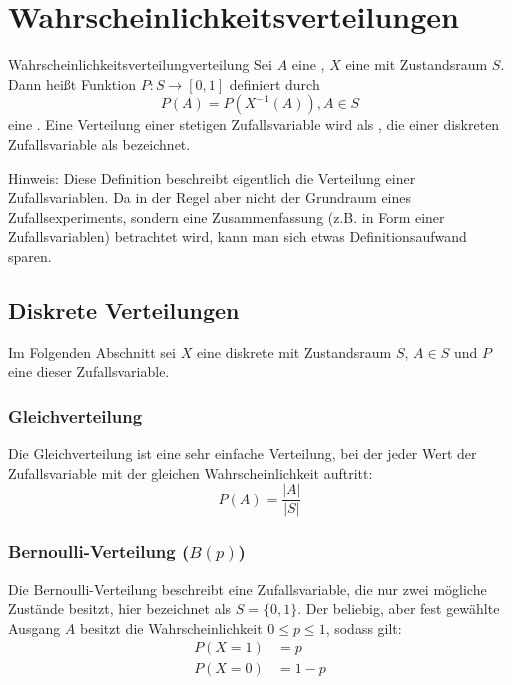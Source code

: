 \chapter{Wahrscheinlichkeitsverteilungen}

\begin{definition}{Wahrscheinlichkeitsverteilung}{verteilung}
Sei $A$ eine , $X$ eine 
mit Zustandsraum $S$. Dann heißt Funktion $P: S \rightarrow [0,1]$ definiert
durch
\[
P(A) = P(X^{-1}(A)), A \in S
\]
eine . Eine Verteilung einer stetigen
Zufallsvariable wird als , die einer diskreten
Zufallsvariable als  bezeichnet.
\end{definition}

Hinweis: Diese Definition beschreibt eigentlich die Verteilung einer
Zufallsvariablen. Da in der Regel aber nicht der Grundraum eines
Zufallsexperiments, sondern eine Zusammenfassung (z.B. in Form einer
Zufallsvariablen) betrachtet wird, kann man sich etwas Definitionsaufwand
sparen.

\section{Diskrete Verteilungen}

Im Folgenden Abschnitt sei $X$ eine diskrete 
mit Zustandsraum $S$, $A \in S$ und $P$ eine
 dieser Zufallsvariable.


\subsection{Gleichverteilung}

Die Gleichverteilung ist eine sehr einfache Verteilung, bei der jeder Wert der
Zufallsvariable mit der gleichen Wahrscheinlichkeit auftritt:
\[
P(A) = \frac{|A|}{|S|}
\]

\subsection{Bernoulli-Verteilung ($B(p)$)}

Die Bernoulli-Verteilung beschreibt eine Zufallsvariable, die nur zwei mögliche
Zustände besitzt, hier bezeichnet als $S = \{0,1\}$. Der beliebig, aber fest
gewählte Ausgang $A$ besitzt die Wahrscheinlichkeit $0 \le p \le 1$, sodass
gilt:
\begin{align*}
P(X=1)&=p  \\
P(X=0)&=1-p
\end{align*}

